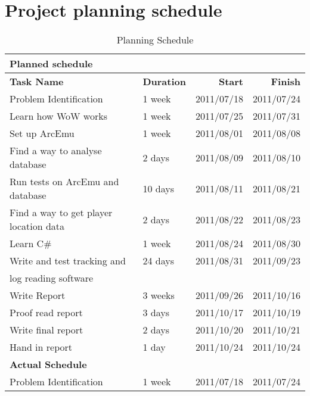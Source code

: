 \chapter{Project planning schedule}



\begin{table}[htbp]
  \centering
  \caption{Planning Schedule}
    \begin{tabular}{llrr}
    \addlinespace
    \toprule
    \textbf{Planned schedule} &       &       &  \\
    \midrule
    \textbf{Task Name} & \textbf{Duration} & \textbf{Start} & \textbf{Finish} \\
    \midrule
    Problem Identification & 1 week & 2011/07/18 & 2011/07/24 \\
    Learn how WoW works & 1 week & 2011/07/25 & 2011/07/31 \\
    Set up ArcEmu & 1 week & 2011/08/01 & 2011/08/08 \\
    Find a way to analyse database & 2 days & 2011/08/09 & 2011/08/10 \\
    Run tests on ArcEmu and database & 10 days & 2011/08/11 & 2011/08/21 \\
    Find a way to get player location data & 2 days & 2011/08/22 & 2011/08/23 \\
    Learn C\# & 1 week & 2011/08/24 & 2011/08/30 \\
    Write and test tracking and & 24 days & 2011/08/31 & 2011/09/23 \\
    log reading software &       &       &  \\
    Write Report & 3 weeks & 2011/09/26 & 2011/10/16 \\
    Proof read report & 3 days & 2011/10/17 & 2011/10/19 \\
    Write final report & 2 days & 2011/10/20 & 2011/10/21 \\
    Hand in report & 1 day & 2011/10/24 & 2011/10/24 \\
    \midrule
    \textbf{Actual Schedule} &       &       &  \\
    \midrule
    Problem Identification & 1 week & 2011/07/18 & 2011/07/24 \\

\end{tabular}
\end{table}
